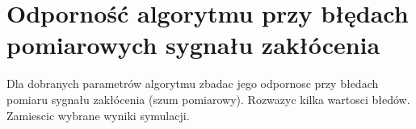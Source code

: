 \section{Odporność algorytmu przy błędach pomiarowych sygnału zakłócenia}

Dla dobranych parametrów algorytmu zbadac jego odpornosc przy błedach pomiaru
sygnału zakłócenia (szum pomiarowy). Rozwazyc kilka wartosci błedów. Zamiescic
wybrane wyniki symulacji.
